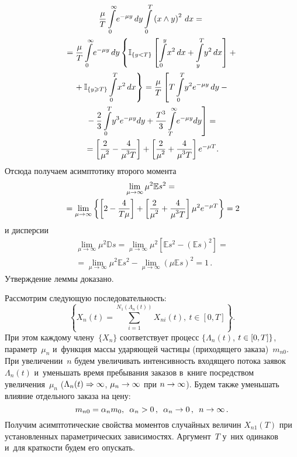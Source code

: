 \begin{multicols}{2}
\begin{multline*}
\fr{\mu}{T}\int\limits_{0}^{\infty}\!e^{-\mu y}\,dy
\int\limits_{0}^{T}\left(x\wedge y\right)^2\,dx = {}\\
{}=\fr{\mu}{T}\int\limits_{0}^{\infty}\!e^{-\mu y}\,dy\left\{
\mathbb{I}_{\{y<T\}}\left[{\int\limits_{0}^{y}\!x^2\,dx+
\int\limits_{y}^{T}\!y^2\,dx}\right] + {}\right.\\
\left.{}+
\mathbb{I}_{\{y\geqslant T\}}\int\limits_{0}^{T}\!x^2\,dx\right\}= 
\fr{\mu}{T}\left[T\int\limits_{0}^{T}\!y^2e^{-\mu y}\,dy -{}\right.\\
\left.{}-
\fr{2}{3}\int\limits_{0}^{T}\!y^3e^{-\mu y}dy + 
\fr{T^3}{3}\int\limits_{T}^{\infty}\!e^{-\mu y}dy \right]= {}\\
{}=\left[\fr{2}{\mu^2}-\fr{4}{\mu^3 T}\right]+\left[
\fr{2}{\mu^2}+\fr{4}{\mu^3 T}\right]e^{-\mu T}.
\end{multline*}
Отсюда получаем асимптотику второго момента
\begin{multline*}
\lim\limits_{\mu \rightarrow \infty}\mu^2\mathbb{E}s^2 = {}\\
{}=
\lim\limits_{\mu \rightarrow \infty}\left\{\left[2-\displaystyle\frac{\displaystyle 4\mathstrut}{\displaystyle T\mu\mathstrut}\right]+
\left[\displaystyle\frac{\displaystyle 2\mathstrut}{\displaystyle \mu^2\mathstrut}+\displaystyle\frac{\displaystyle 4\mathstrut}{\displaystyle \mu^3 T\mathstrut}\right]\mu^2e^{-\mu T}\right\} = 2
\end{multline*}
и дисперсии
\begin{multline*}
\lim\limits_{\mu \rightarrow \infty}\mu^2\mathbb{D}s =  
\lim\limits_{\mu \rightarrow \infty}\mu^2\left[\mathbb{E}s^2-(\mathbb{E}s)^2\right] ={}\\
{}=
 \lim\limits_{\mu \rightarrow \infty}\mu^2\mathbb{E}s^2 - 
  \lim\limits_{\mu \rightarrow \infty}(\mu\mathbb{E}s)^2 =1\,.
\end{multline*}
Утверждение леммы доказано.

\smallskip

Рассмотрим следующую последовательность:
\begin{equation}
\left\{X_{n}(t) = \sum\limits_{i=1}^{N_1(\Lambda_n(t))}X_{ni}(t),\ 
 t \in [0,T]\right\}.
 \label{e3-naz}
\end{equation}
При этом каждому члену~$\{X_n\}$ соответствует процесс $\{\Lambda_n(t)$, 
$t\hm\in [0,T]\}$, параметр~$\mu_n$ и~функция массы ударяющей частицы (приходящего 
заказа)~$m_{n0}$. При увеличении~$n$ будем увеличивать интенсивность входящего 
потока заявок~$\Lambda_n(t)$ и~уменьшать время пребывания заказов в~книге 
посредством увеличения~$\mu_n$ ($\Lambda_n(t)\hm\Rightarrow\infty$, 
$\mu_n\hm\rightarrow\infty$ при $n \hm\rightarrow \infty$). Будем также 
уменьшать влияние отдельного заказа на цену:
\begin{equation*}
m_{n0} = \alpha_n m_0,\enskip
 \alpha_n >0\,,\enskip
  \alpha_n \rightarrow 0\,,\enskip
   n\rightarrow\infty\,.
\end{equation*}
Получим асимптотические свойства моментов случайных величин $X_{n1}(T)$ 
при установленных параметрических зависимостях. Аргумент~$T$ у~них одинаков и~для 
краткости будем его опускать.


\end{multicols}
